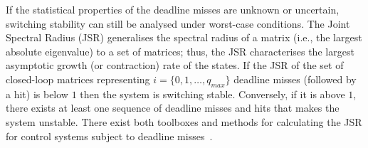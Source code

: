 If the statistical properties of the deadline misses are unknown or uncertain, switching stability can still be analysed under worst-case conditions.
The Joint Spectral Radius (JSR) generalises the spectral radius of a matrix (i.e., the largest absolute eigenvalue) to a set of matrices; thus, the JSR characterises the largest asymptotic growth (or contraction) rate of the states. %
If the JSR of the set of closed-loop matrices representing $i = \{0,1,\ldots,q_{max}\}$ deadline misses (followed by a hit) is below $1$ then the system is switching stable.
Conversely, if it is above $1$, there exists at least one sequence of deadline misses and hits that makes the system unstable.
There exist both toolboxes and methods for calculating the JSR for control systems subject to deadline misses~\cite{Jungers:2014, Maggio:2020, Vreman:2021}.
